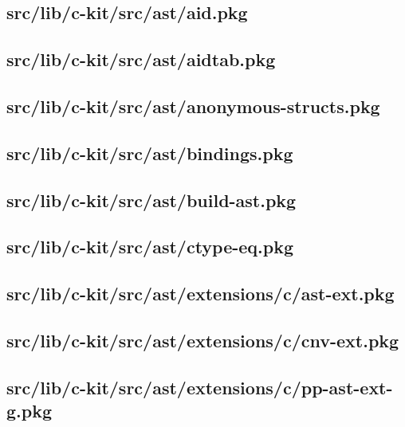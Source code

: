 \subsection{src/lib/c-kit/src/ast/aid.pkg}


\subsection{src/lib/c-kit/src/ast/aidtab.pkg}


\subsection{src/lib/c-kit/src/ast/anonymous-structs.pkg}


\subsection{src/lib/c-kit/src/ast/bindings.pkg}


\subsection{src/lib/c-kit/src/ast/build-ast.pkg}


\subsection{src/lib/c-kit/src/ast/ctype-eq.pkg}


\subsection{src/lib/c-kit/src/ast/extensions/c/ast-ext.pkg}


\subsection{src/lib/c-kit/src/ast/extensions/c/cnv-ext.pkg}


\subsection{src/lib/c-kit/src/ast/extensions/c/pp-ast-ext-g.pkg}


